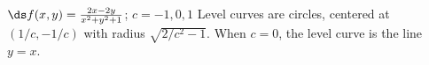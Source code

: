{$\ds f(x,y) = \frac{2x-2y}{x^2+y^2+1}$; $c = -1,0,1$}
{Level curves are circles, centered at $(1/c,-1/c)$ with radius $\sqrt{2/c^2-1}$. When $c=0$, the level curve is the line $y=x$.\\
}